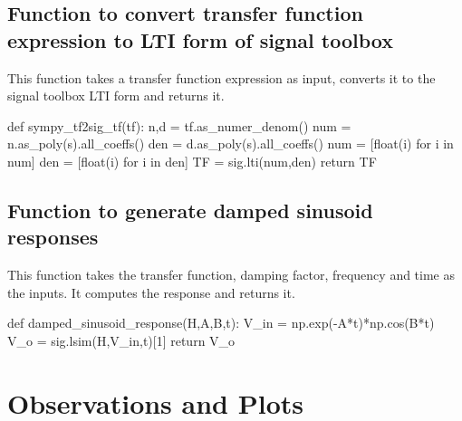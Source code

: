 \documentclass[12pt, a4paper]{article}
\begin{document}
\subsection{Function to convert transfer function expression to LTI form of signal toolbox}
This function takes a transfer function expression as input, converts it to the signal toolbox LTI form and returns it.
\begin{py_code}
    def sympy_tf2sig_tf(tf):
        n,d = tf.as_numer_denom()
        num = n.as_poly(s).all_coeffs()
        den = d.as_poly(s).all_coeffs()
        num = [float(i) for i in num]
        den = [float(i) for i in den]
        TF = sig.lti(num,den)
        return TF
\end{py_code}
\subsection{Function to generate damped sinusoid responses}
This function takes the transfer function, damping factor, frequency and time as the inputs. It computes the response and returns it.
\begin{py_code}
    def damped_sinusoid_response(H,A,B,t):
        V_in = np.exp(-A*t)*np.cos(B*t)
        V_o = sig.lsim(H,V_in,t)[1]
        return V_o
\end{py_code}
\section{Observations and Plots}
\end{document}
